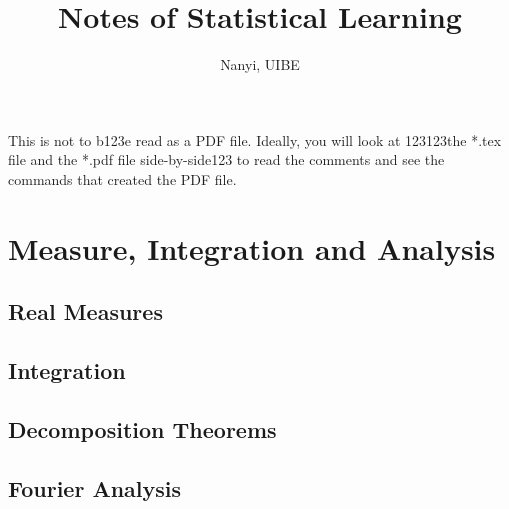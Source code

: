 \documentclass[12pt]{book}
\theoremstyle{definition}
\begin{document}
\title{Notes of Statistical Learning}
\author{Nanyi, UIBE}
\maketitle %

This is not to b123e read as a PDF file.  Ideally, you will look at 123123the *.tex file and the *.pdf file side-by-side123 to read the comments and see the commands that created the PDF file.
\tableofcontents
\chapter{Measure, Integration and Analysis}
\section{Real Measures}
\section{Integration}
\section{Decomposition Theorems}
\section{Fourier Analysis}
\end{document}
